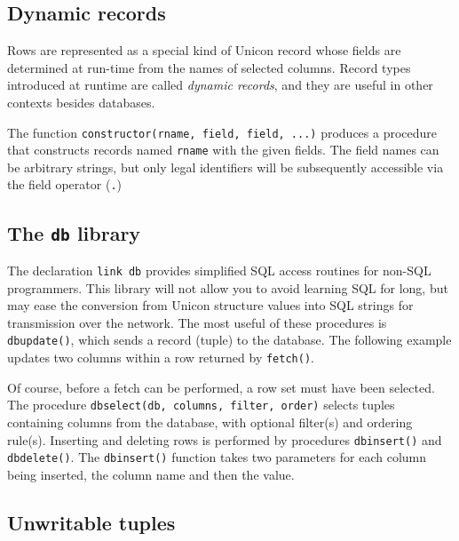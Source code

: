 \subsection*{Dynamic records}

Rows are represented as a special kind of Unicon record whose
fields are determined at run-time from the names
of selected columns. Record types introduced at runtime
are called \textit{dynamic records}, and they are useful in other
contexts besides databases.

The function \texttt{constructor(rname, field, field, ...)} produces a
procedure that constructs records named
\texttt{rname} with the given fields. The field names
can be arbitrary strings, but only legal identifiers
will be subsequently accessible via the field operator (\texttt{.})

\subsection*{The \texttt{db} library}

The declaration \texttt{link db} provides simplified SQL access routines
for non-SQL programmers.
This library will not allow you to avoid learning SQL for long,
but may ease the conversion from Unicon structure values into SQL
strings for transmission over the network.
The most useful of these procedures is \texttt{dbupdate()}, which sends
a record (tuple) to the database. The following example updates two
columns within a row returned by \texttt{fetch()}.


Of course, before a fetch can be performed, a row set must have been
selected. The procedure \texttt{dbselect(db, columns, filter, order)}
selects tuples containing columns from the database, with optional
filter(s) and ordering rule(s).
Inserting and deleting rows is performed by procedures
\texttt{dbinsert()} and \texttt{dbdelete()}. The \texttt{dbinsert()}
function takes two parameters for each column being inserted, the
column name and then the value.

\subsection*{Unwritable tuples}

